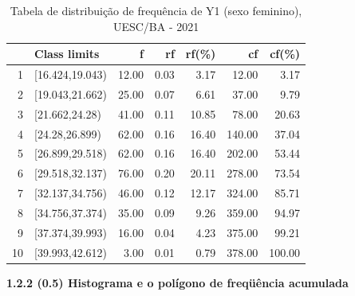 \documentclass[12pt]{article}\usepackage[]{graphicx}\usepackage[]{color}
\begin{document}
\begin{table}[!ht]
\centering
\caption{Tabela de distribuição de frequência de Y1 (sexo feminino), UESC/BA - 2021}
  \begin{tabular}{rlrrrrr}
    \toprule
   & Class limits & f & rf & rf(\%) & cf & cf(\%) \\ 
    \midrule
  1 & [16.424,19.043) & 12.00 & 0.03 & 3.17 & 12.00 & 3.17 \\ 
    2 & [19.043,21.662) & 25.00 & 0.07 & 6.61 & 37.00 & 9.79 \\ 
    3 & [21.662,24.28) & 41.00 & 0.11 & 10.85 & 78.00 & 20.63 \\ 
    4 & [24.28,26.899) & 62.00 & 0.16 & 16.40 & 140.00 & 37.04 \\ 
    5 & [26.899,29.518) & 62.00 & 0.16 & 16.40 & 202.00 & 53.44 \\ 
    6 & [29.518,32.137) & 76.00 & 0.20 & 20.11 & 278.00 & 73.54 \\ 
    7 & [32.137,34.756) & 46.00 & 0.12 & 12.17 & 324.00 & 85.71 \\ 
    8 & [34.756,37.374) & 35.00 & 0.09 & 9.26 & 359.00 & 94.97 \\ 
    9 & [37.374,39.993) & 16.00 & 0.04 & 4.23 & 375.00 & 99.21 \\ 
    10 & [39.993,42.612) & 3.00 & 0.01 & 0.79 & 378.00 & 100.00 \\ 
     \bottomrule
  \end{tabular}
\end{table}
 \pagebreak
      \textbf{1.2.2 (0.5) Histograma e o polígono de freqüência acumulada}
\end{document}

